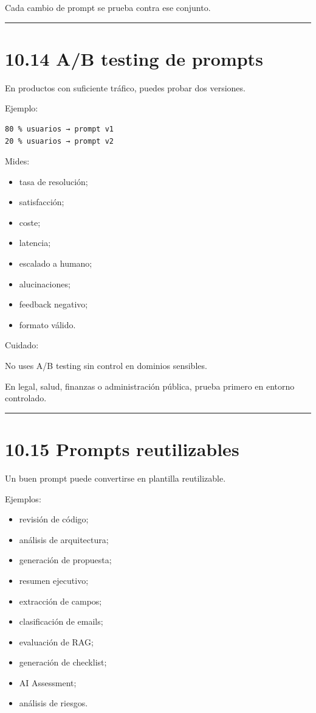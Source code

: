 Cada cambio de prompt se prueba contra ese conjunto.

\begin{center}\rule{0.5\linewidth}{0.5pt}\end{center}

\section{10.14 A/B testing de prompts}\label{ab-testing-de-prompts}

En productos con suficiente tráfico, puedes probar dos versiones.

Ejemplo:

\begin{lstlisting}
80 % usuarios → prompt v1
20 % usuarios → prompt v2
\end{lstlisting}

Mides:

\begin{itemize}
\tightlist
\item
  tasa de resolución;
\item
  satisfacción;
\item
  coste;
\item
  latencia;
\item
  escalado a humano;
\item
  alucinaciones;
\item
  feedback negativo;
\item
  formato válido.
\end{itemize}

Cuidado:

No uses A/B testing sin control en dominios sensibles.

En legal, salud, finanzas o administración pública, prueba primero en
entorno controlado.

\begin{center}\rule{0.5\linewidth}{0.5pt}\end{center}

\section{10.15 Prompts reutilizables}\label{prompts-reutilizables}

Un buen prompt puede convertirse en plantilla reutilizable.

Ejemplos:

\begin{itemize}
\tightlist
\item
  revisión de código;
\item
  análisis de arquitectura;
\item
  generación de propuesta;
\item
  resumen ejecutivo;
\item
  extracción de campos;
\item
  clasificación de emails;
\item
  evaluación de RAG;
\item
  generación de checklist;
\item
  AI Assessment;
\item
  análisis de riesgos.
\end{itemize}

